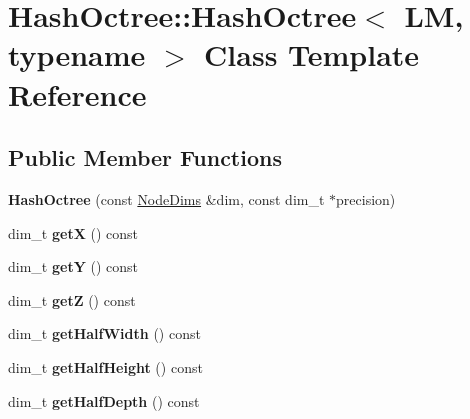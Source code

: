 \hypertarget{class_hash_octree_1_1_hash_octree}{}\section{Hash\+Octree\+::Hash\+Octree$<$ LM, typename $>$ Class Template Reference}
\label{class_hash_octree_1_1_hash_octree}
\subsection*{Public Member Functions}
\begin{DoxyCompactItemize}
\item 
\mbox{\label{class_hash_octree_1_1_hash_octree_a3f7c9cdda60165a7dc5f141ed61223a5}} 
{\bfseries Hash\+Octree} (const \mbox{\hyperlink{class_hash_octree_1_1_node_dims}{Node\+Dims}} \&dim, const dim\+\_\+t $\ast$precision)
\item 
\mbox{\label{class_hash_octree_1_1_hash_octree_a00e03ca6bcd7f753165788959beb7b71}} 
dim\+\_\+t {\bfseries getX} () const
\item 
\mbox{\label{class_hash_octree_1_1_hash_octree_a7a19ffbdb5b171b362fb196ebf1e4a75}} 
dim\+\_\+t {\bfseries getY} () const
\item 
\mbox{\label{class_hash_octree_1_1_hash_octree_a1414071b29e86153061456a90290f044}} 
dim\+\_\+t {\bfseries getZ} () const
\item 
\mbox{\label{class_hash_octree_1_1_hash_octree_a23cf5c4874bec3faf81f71038880869d}} 
dim\+\_\+t {\bfseries get\+Half\+Width} () const
\item 
\mbox{\label{class_hash_octree_1_1_hash_octree_a4fe36820f49b62193de70925311cbc9d}} 
dim\+\_\+t {\bfseries get\+Half\+Height} () const
\item 
\mbox{\label{class_hash_octree_1_1_hash_octree_a0dbd000807a19cd0f3ea26f4def008ca}} 
dim\+\_\+t {\bfseries get\+Half\+Depth} () const
\item 

\end{DoxyCompactItemize}
